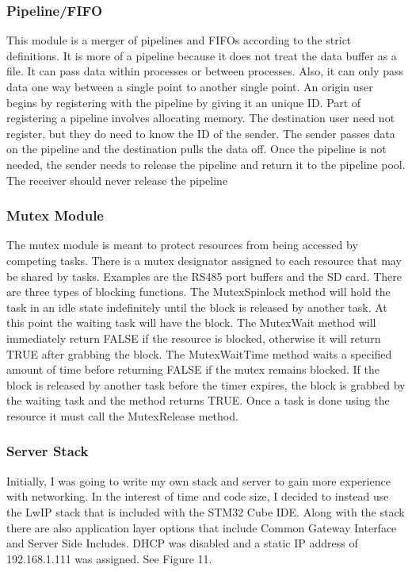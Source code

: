 \documentclass[acmlarge,screen]{acmart}
\begin{document}
\subsubsection{Pipeline/FIFO}
This module is a merger of pipelines and FIFOs according to the strict definitions. It is more of a pipeline because it does not treat the data buffer as a file. It can pass data within processes or between processes. Also, it can only pass data one way between a single point to another single point. An origin user begins by registering with the pipeline by giving it an unique ID. Part of registering a pipeline involves allocating memory. The destination user need not register, but they do need to know the ID of the sender. The sender passes data on the pipeline and the destination pulls the data off. Once the pipeline is not needed, the sender needs to release the pipeline and return it to the pipeline pool. The receiver should never release the pipeline
\subsubsection{Mutex Module}
The mutex module is meant to protect resources from being accessed by competing tasks. There is a mutex designator assigned to each resource that may be shared by tasks. Examples are the RS485 port buffers and the SD card. There are three types of blocking functions. The MutexSpinlock method will hold the task in an idle state indefinitely until the block is released by another task. At this point the waiting task will have the block. The MutexWait method will immediately return FALSE if the resource is blocked, otherwise it will return TRUE after grabbing the block. The MutexWaitTime method waits a specified amount of time before returning FALSE if the mutex remains blocked. If the block is released by another task before the timer expires, the block is grabbed by the waiting task and the method returns TRUE. Once a task is done using the resource it must call the MutexRelease method.
\subsubsection{Server Stack}
Initially, I was going to write my own stack and server to gain more experience with networking. In the interest of time and code size, I decided to instead use the LwIP stack that is included with the STM32 Cube IDE. Along with the stack there are also application layer options that include Common Gateway Interface and Server Side Includes. DHCP was disabled and a static IP address of 192.168.1.111 was assigned. See Figure 11.\\
\end{document}
